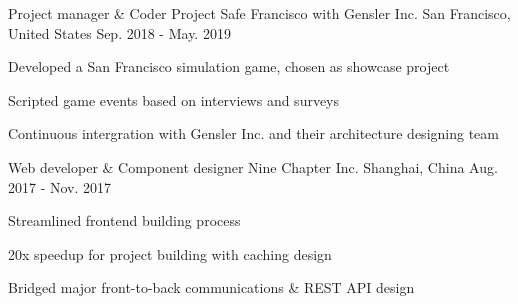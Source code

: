 \begin{cventries}
  \cventry
    {Project manager \& Coder}
    {Project Safe Francisco with Gensler Inc.}
    {San Francisco, United States}
    {Sep. 2018 - May. 2019}
    {
      \begin{cvitems}
        \item {Developed a San Francisco simulation game, chosen as showcase project}
        \item {Scripted game events based on interviews and surveys}
        \item {Continuous intergration with Gensler Inc. and their architecture designing team}
      \end{cvitems}
    }

  \cventry
    {Web developer \& Component designer}
    {Nine Chapter Inc.}
    {Shanghai, China}
    {Aug. 2017 - Nov. 2017}
    {
      \begin{cvitems}
        \item {Streamlined frontend building process}
        \item {20x speedup for project building with caching design}
        \item {Bridged major front-to-back communications \& REST API design}
      \end{cvitems}
    }


\end{cventries}

